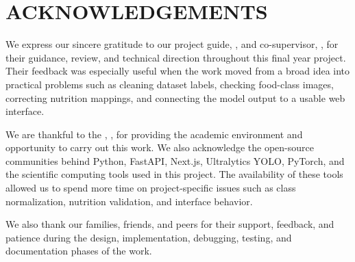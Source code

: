 \chapter*{ACKNOWLEDGEMENTS}

We express our sincere gratitude to our project guide, \supervisor, and co-supervisor, \cosupervisor, for their guidance, review, and technical direction throughout this final year project. Their feedback was especially useful when the work moved from a broad idea into practical problems such as cleaning dataset labels, checking food-class images, correcting nutrition mappings, and connecting the model output to a usable web interface.

We are thankful to the \department, \institute, for providing the academic environment and opportunity to carry out this work. We also acknowledge the open-source communities behind Python, FastAPI, Next.js, Ultralytics YOLO, PyTorch, and the scientific computing tools used in this project. The availability of these tools allowed us to spend more time on project-specific issues such as class normalization, nutrition validation, and interface behavior.

We also thank our families, friends, and peers for their support, feedback, and patience during the design, implementation, debugging, testing, and documentation phases of the work.

\vspace{1.5cm}
\begin{flushright}
\textbf{\studentone}\\
\enrollmentone\\[0.4cm]
\textbf{\studenttwo}\\
\enrollmenttwo
\end{flushright}

